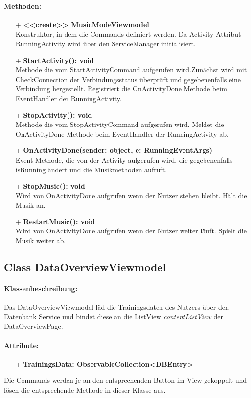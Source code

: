 \documentclass[a4paper,12pt]{article}
\begin{document}
\paragraph{Methoden:}
\begin{itemize}
	\item[+] \textbf{<<create>> MusicModeViewmodel} \\ Konstruktor, in dem die Commands definiert werden. Da Activity Attribut RunningActivity wird über den ServiceManager initialisiert.
	\item[+] \textbf{StartActivity(): void} \\ Methode die vom StartActivityCommand aufgerufen wird.Zunächst wird mit CheckConnection der Verbindungsstatus überprüft und gegebenenfalls eine Verbindung hergestellt. Registriert die OnActivityDone Methode beim EventHandler der RunningActivity. 
	\item[+] \textbf{StopActivity(): void} \\ Methode die vom StopActivityCommand aufgerufen wird. Meldet die OnActivityDone Methode beim EventHandler der RunningActivity ab. 
	\item[+] \textbf{OnActivityDone(sender: object, e: RunningEventArgs)} \\ Event Methode, die von der Activity aufgerufen wird, die gegebenenfalls isRunning ändert und die Musikmethoden aufruft.
	\item[+] \textbf{StopMusic(): void} \\ Wird von OnActivityDone aufgrufen wenn der Nutzer stehen bleibt. Hält die Musik an.
	\item[+] \textbf{RestartMusic(): void} \\ Wird von OnActivityDone aufgrufen wenn der Nutzer weiter läuft. Spielt die Musik weiter ab.
\end{itemize}

\subsection{Class DataOverviewViewmodel}
\paragraph{Klassenbeschreibung:}
Das DataOverviewViewmodel läd die Trainingsdaten des Nutzers über den Datenbank Service und bindet diese an die ListView \textit{contentListView} der DataOverviewPage.
\paragraph{Attribute:}
\begin{itemize}
	\item[+] \textbf{TrainingsData: ObservableCollection<DBEntry>}
\end{itemize}
Die Commands werden je an den entsprechenden Button im View gekoppelt und lösen die entsprechende Methode in dieser Klasse aus.
\end{document}
